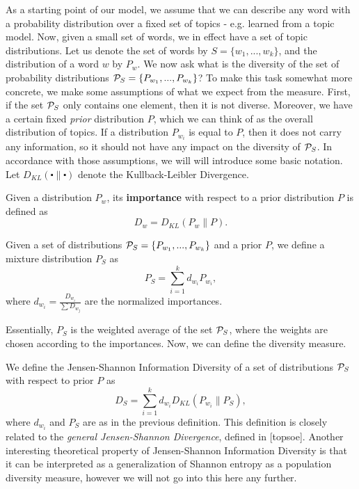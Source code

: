 As a starting point of our model, we assume that we can describe any
word with a probability distribution over a fixed set of topics -
e.g. learned from a topic model. Now, given a small
set of words, we in effect have a set of topic distributions. Let us
denote the set of words by $S=\{w_1,...,w_k\}$, and the distribution
of a word $w$ by $P_w$.  We now ask
what is the diversity of the set of probability
distributions ${\mathcal P}_S=\{P_{w_1},...,P_{w_k}\}$? To make this task
somewhat more concrete, we make some 
assumptions of what we expect from the measure. First, if the set
${\mathcal P}_S$ only contains one element, then it is not diverse. Moreover,
we have a certain fixed {\em prior} distribution $P$, which we
can think of as the overall distribution of topics. If a distribution
$P_{w_i}$ is equal to $P$, then it does not carry any information, so
it should not have any impact on the diversity of ${\mathcal P}_S$. In
accordance with those assumptions, we will will introduce some basic
notation. Let $D_{KL}(\centerdot\|\centerdot)$ denote the
Kullback-Leibler Divergence.

\bed
Given a distribution $P_w$, its {\bf importance} with respect to a
prior distribution $P$ is defined as 
\[D_w = D_{KL}(P_w\|P).\]
\eed

\bed\label{mixture}
Given a set of distributions ${\mathcal P}_S=\{P_{w_1},...,P_{w_k}\}$ and a
prior $P$, we
define a mixture distribution $P_S$ as
\[P_S=\sum_{i=1}^k d_{w_i} P_{w_i},\]
where $d_{w_i}=\frac{D_{w_i}}{\sum D_{w_j}}$ are the normalized
importances.
\eed

Essentially, $P_S$ is the weighted average of the set ${\mathcal P}_S$, where
the weights are chosen according to the importances. Now, we can
define the diversity measure.

\bed\label{diversity}
We define the Jensen-Shannon Information Diversity of a set of
distributions ${\mathcal P}_S$ with respect to 
prior $P$ as
\[D_S=\sum_{i=1}^k d_{w_i}D_{KL}(P_{w_i}\|P_S), \]
where $d_{w_i}$ and $P_S$ are as in the previous definition.
\eed
This definition is closely related to the 
{\em general Jensen-Shannon Divergence}, defined in [topsoe]. Another
interesting theoretical property of Jensen-Shannon Information
Diversity is that it can be interpreted as a generalization of Shannon
entropy as a population diversity measure, however we will not go
into this here any further. 

